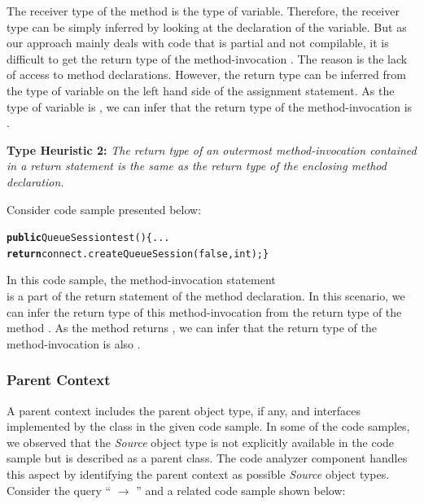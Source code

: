 \documentclass{fp035-thummalapenta}
\begin{document}
The receiver type of the method
 is the type of 
variable. Therefore, the receiver type can be simply inferred by
looking at the declaration of the  variable. But as
our approach mainly deals with code that is partial and not
compilable, it is difficult to get the return type of the
method-invocation  . The reason is the
lack of access to method declarations. However, the return type can
be inferred from the type of variable  on the left
hand side of the assignment statement. As the type of variable
 is , we can infer that the
return type of the method-invocation  is
.

\textbf{Type Heuristic 2:} \emph{The return type of an outermost
method-invocation contained in a return statement is the same as the
return type of the enclosing method declaration.}

Consider code sample presented below:
\begin{CodeOut}
\begin{alltt}
\textbf{public} QueueSession test()\hspace*{0.2in}\{ ...
\hspace*{0.4in}\textbf{return} connect.createQueueSession(false,int);\}
\end{alltt}
\end{CodeOut}

In this code sample, the method-invocation statement\\
 is a part of the return statement of the
method declaration. In this scenario, we can infer the return type of
this method-invocation from the return type of the method .
As the method  returns , we
can infer that the return type of the
method-invocation  is also
.

\subsubsection{Parent Context}
\label{sec:parentcontext}
A parent context includes the parent object type, if any, and
interfaces implemented by the class in the given code sample. In some of the code
samples, we observed that the \emph{Source} object type is not
explicitly available in the code sample but is described as a
parent class. The code analyzer component handles this aspect by identifying the
parent context as possible \emph{Source} object types. Consider the
query `` $\rightarrow$
'' and a related code sample shown below:\vspace*{-2ex}
\end{document}
